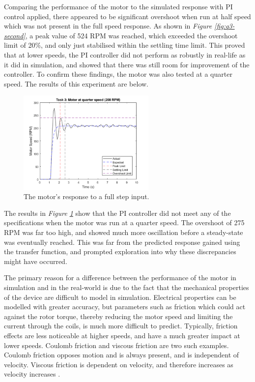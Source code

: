\documentclass[11pt, onecolumn]{article}
\begin{document}
\par Comparing the performance of the motor to the simulated response with PI control applied, there appeared to be significant overshoot when run at half speed which was not present in the full speed response. As shown in \textit{Figure \ref{fig:q3-second}}, a peak value of 524 RPM was reached, which exceeded the overshoot limit of 20\%, and only just stabilised within the settling time limit. This proved that at lower speeds, the PI controller did not perform as robustly in real-life as it did in simulation, and showed that there was still room for improvement of the controller. To confirm these findings, the motor was also tested at a quarter speed. The results of this experiment are below.
\begin{figure}[h!]
    \centering
    \includegraphics[width=0.6\textwidth]{q3-g3.png}
    \caption{The motor's response to a full step input.}
    \label{fig:q3-third}
\end{figure}
\par The results in \textit{Figure \ref{fig:q3-third}} show that the PI controller did not meet any of the specifications when the motor was run at a quarter speed. The overshoot of 275 RPM was far too high, and showed much more oscillation before a steady-state was eventually reached. This was far from the predicted response gained using the transfer function, and prompted exploration into why these discrepancies might have occurred.
\par The primary reason for a difference between the performance of the motor in simulation and in the real-world is due to the fact that the mechanical properties of the device are difficult to model in simulation. Electrical properties can be modelled with greater accuracy, but parameters such as friction which could act against the rotor torque, thereby reducing the motor speed and limiting the current through the coils, is much more difficult to predict. Typically, friction effects are less noticeable at higher speeds, and have a much greater impact at lower speeds. Coulomb friction and viscous friction are two such examples. Coulomb friction opposes motion and is always present, and is independent of velocity. Viscous friction is dependent on velocity, and therefore increases as velocity increases \cite{Virgala2013}.
\end{document}
